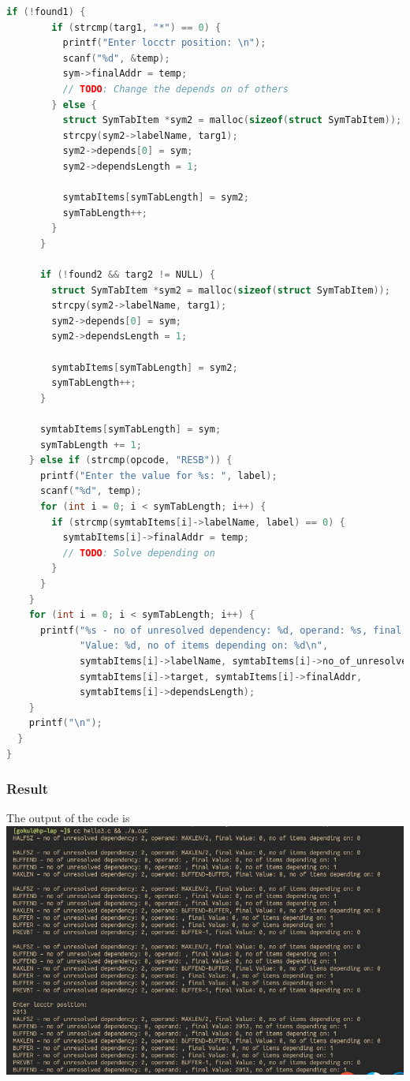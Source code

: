 \documentclass[13pt,oneside]{article}
\begin{document}
\begin{lstlisting}[language=C]
      if (!found1) {
        if (strcmp(targ1, "*") == 0) {
          printf("Enter locctr position: \n");
          scanf("%d", &temp);
          sym->finalAddr = temp;
          // TODO: Change the depends on of others
        } else {
          struct SymTabItem *sym2 = malloc(sizeof(struct SymTabItem));
          strcpy(sym2->labelName, targ1);
          sym2->depends[0] = sym;
          sym2->dependsLength = 1;

          symtabItems[symTabLength] = sym2;
          symTabLength++;
        }
      }

      if (!found2 && targ2 != NULL) {
        struct SymTabItem *sym2 = malloc(sizeof(struct SymTabItem));
        strcpy(sym2->labelName, targ1);
        sym2->depends[0] = sym;
        sym2->dependsLength = 1;

        symtabItems[symTabLength] = sym2;
        symTabLength++;
      }

      symtabItems[symTabLength] = sym;
      symTabLength += 1;
    } else if (strcmp(opcode, "RESB")) {
      printf("Enter the value for %s: ", label);
      scanf("%d", temp);
      for (int i = 0; i < symTabLength; i++) {
        if (strcmp(symtabItems[i]->labelName, label) == 0) {
          symtabItems[i]->finalAddr = temp;
          // TODO: Solve depending on
        }
      }
    }
    for (int i = 0; i < symTabLength; i++) {
      printf("%s - no of unresolved dependency: %d, operand: %s, final "
             "Value: %d, no of items depending on: %d\n",
             symtabItems[i]->labelName, symtabItems[i]->no_of_unresolved,
             symtabItems[i]->target, symtabItems[i]->finalAddr,
             symtabItems[i]->dependsLength);
    }
    printf("\n");
  }
}
\end{lstlisting}
\subsubsection{Result}
The output of the code is \\
\includegraphics[width=\textwidth]{img/q/ss1.png}
\end{document}
